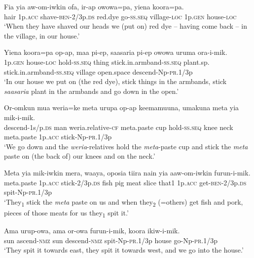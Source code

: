 \ea
\gll  Fia  yia  aw-om-iwkin  ofa,  ir-ap  owowa=pa,              yiena  koora=pa. \\
hair  1p.\textsc{acc}  shave-\textsc{ben}-2/3p.\textsc{ds}  red.dye  go-\textsc{ss.seq}  village-\textsc{loc} 1p.\textsc{gen}  house-\textsc{loc} \\


\glt ‘When they have shaved our heads we (put on) red dye – having come back – in the village, in our house.’ \\
\z


\ea
\gll  Yiena  koora=pa  op-ap,  maa  pi-ep,                      saasaria  pi-ep  owowa  uruma  ora-i-mik. \\
1p.\textsc{gen}  house-\textsc{loc}  hold-\textsc{ss.seq}  thing  stick.in.armband-\textsc{ss.seq}  plant.sp.  stick.in.armband-\textsc{ss.seq}  village  open.space  descend-Np-\textsc{pr}.1/3p \\


\glt ‘In our house we put on (the red dye), stick things in the armbands, stick \textit{saasaria} plant in the armbands and go down in the open.’ \\
\z


\ea
\gll  Or-omkun  mua  weria=ke  meta  urupa  op-ap                      keemamuuna,  umakuna  meta  yia  mik-i-mik. \\
descend-1s/p.\textsc{ds}  man  weria.relative-\textsc{cf}  meta.paste  cup  hold-\textsc{ss.seq}  knee  neck  meta.paste  1p.\textsc{acc}  stick-Np-\textsc{pr}.1/3p \\


\glt ‘We go down and the \textit{weria}{}-relatives hold the \textit{meta}{}-paste cup and stick the \textit{meta} paste on (the back of) our knees and on the neck.’ \\
\z


\ea
\gll  Meta  yia  mik-iwkin  mera,  waaya,  oposia  tiira  nain    yia  aaw-om-iwkin  furun-i-mik. \\
meta.paste  1p.\textsc{acc}  stick-2/3p.\textsc{ds}  fish  pig  meat  slice  that1  1p.\textsc{acc}  get-\textsc{ben}-2/3p.\textsc{ds}  spit-Np-\textsc{pr}.1/3p \\


\glt ‘They\textsubscript{1} stick the \textit{meta} paste on us and when they\textsubscript{2} (=others) get fish and pork, pieces of those meats for us they\textsubscript{1} spit it.’ \\
\z


\ea
\gll  Ama  urup-owa,  ama  or-owa  furun-i-mik,  koora  ikiw-i-mik. \\
sun  ascend-\textsc{nmz}  sun  descend-\textsc{nmz}  spit-Np-\textsc{pr}.1/3p  house  go-Np-\textsc{pr}.1/3p \\
\glt ‘They spit it towards east, they spit it towards west, and we go into the house.’ \\
\z


